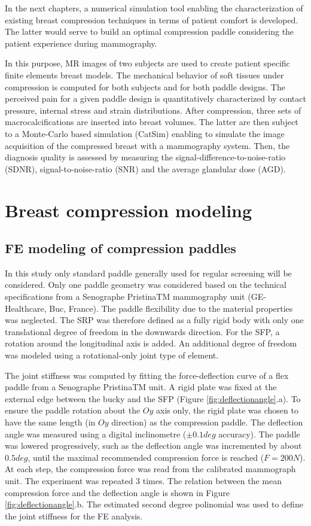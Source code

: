 
In the next chapters, a numerical simulation tool enabling the characterization of existing breast compression techniques in terms of patient comfort is developed. 
 The latter would serve to build an optimal compression paddle considering the patient experience during mammography.  
 
In this purpose, MR images of two subjects are used to create patient specific finite elements breast models. The mechanical behavior of soft tissues under compression is computed for both subjects and for both paddle designs. The perceived pain for a given paddle design is quantitatively characterized by contact pressure, internal stress and strain distributions. After compression, three sets of macrocalcifications are inserted into breast volumes. The latter are then subject to a Monte-Carlo based simulation (CatSim) enabling to simulate the image acquisition of the compressed breast with a mammography system. Then, the diagnosis quality is assessed by measuring the signal-difference-to-noise-ratio (SDNR), signal-to-noise-ratio (SNR) and the average glandular dose (AGD). 

\clearpage


\section{Breast compression modeling}

\subsection{FE modeling of compression paddles}
In this study only standard paddle generally used for regular screening will be considered. Only one paddle geometry was considered based on the technical specifications from a Senographe PristinaTM mammography unit (GE-Healthcare, Buc, France). The paddle flexibility due to the material properties was neglected. The SRP was therefore defined as a fully rigid body with only one translational degree of freedom in the downwards direction. For the SFP, a rotation around the longitudinal axis is added. An additional degree of freedom was modeled using a rotational-only joint type of element.

The joint stiffness was computed by fitting the force-deflection curve of a flex paddle from a Senographe PristinaTM unit. A rigid plate was fixed at the external edge between the bucky and the SFP (Figure \ref{fig:deflectionangle}.a). To ensure the paddle rotation about the $Oy$ axis only, the rigid plate was chosen to have the same length (in $Oy$ direction) as the compression paddle. The deflection angle was measured using a digital inclinometre ($\pm0.1deg$ accuracy). The paddle was lowered progressively, such as the deflection angle was incremented by about $0.5 deg$, until the maximal recommended compression force is reached ($F=200N$). At each step, the compression force was read from the calibrated mammograph unit. The experiment was repeated 3 times. The relation between the mean compression force and the deflection angle is shown in Figure \ref{fig:deflectionangle}.b. The estimated second degree polinomial was used to define the joint stiffness for the FE analysis.


